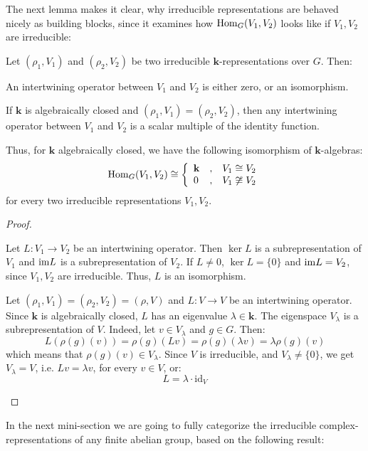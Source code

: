 The next lemma makes it clear, why irreducible representations are behaved nicely as building blocks, since it examines how $\mathrm{Hom}_G(V_1,V_2)$ looks like if $V_1,V_2$ are irreducible:

\begin{lemma}[Schur] Let $(\rho_1,V_1)$ and $(\rho_2,V_2)$ be two irreducible $\mathbf{k}$-representations over $G$. Then:
\begin{i_enum}
\item An intertwining operator between $V_1$ and $V_2$ is either zero, or an isomorphism.
\item If $\mathbf{k}$ is algebraically closed and $(\rho_1,V_1)=(\rho_2,V_2)$, then any intertwining operator between $V_1$ and $V_2$ is a scalar multiple of the identity function.
\end{i_enum}
Thus, for $\mathbf{k}$ algebraically closed, we have the following isomorphism of $\mathbf{k}$-algebras:
$$\mathrm{Hom}_G(V_1,V_2)\cong\left\{\begin{array}{lcl}\mathbf{k}&,&V_1\cong V_2\\0&,&V_1\not\cong V_2\\\end{array}\right.$$
for every two irreducible representations $V_1,V_2$.
\end{lemma}
\begin{proof} \begin{i_enum}
\item Let $L:V_1\to V_2$ be an intertwining operator. Then $\ker L$ is a subrepresentation of $V_1$ and $\mathrm{im } L$ is a subrepresentation of $V_2$. If $L\neq 0$, $\ker L=\{0\}$ and $\mathrm{im } L=V_2$, since $V_1,V_2$ are irreducible. Thus, $L$ is an isomorphism.
\item Let $(\rho_1,V_1)=(\rho_2,V_2)=(\rho,V)$ and $L:V\to V$ be an intertwining operator. Since $\mathbf{k}$ is algebraically closed, $L$ has an eigenvalue $\lambda\in\mathbf{k}$. The eigenspace $V_{\lambda}$ is a subrepresentation of $V$. Indeed, let $v\in V_{\lambda}$ and $g\in G$. Then:
$$L(\rho(g)(v))=\rho(g)(Lv)=\rho(g)(\lambda v)=\lambda\rho(g)(v)$$
which means that $\rho(g)(v)\in V_{\lambda}$. Since $V$ is irreducible, and $V_{\lambda}\neq\{0\}$, we get $V_{\lambda}=V$, i.e. $Lv=\lambda v$, for every $v\in V$, or:
$$L=\lambda\cdot\mathrm{id}_V$$
\end{i_enum}
\end{proof}

In the next mini-section we are going to fully categorize the irreducible complex-representations of any finite abelian group, based on the following result:

